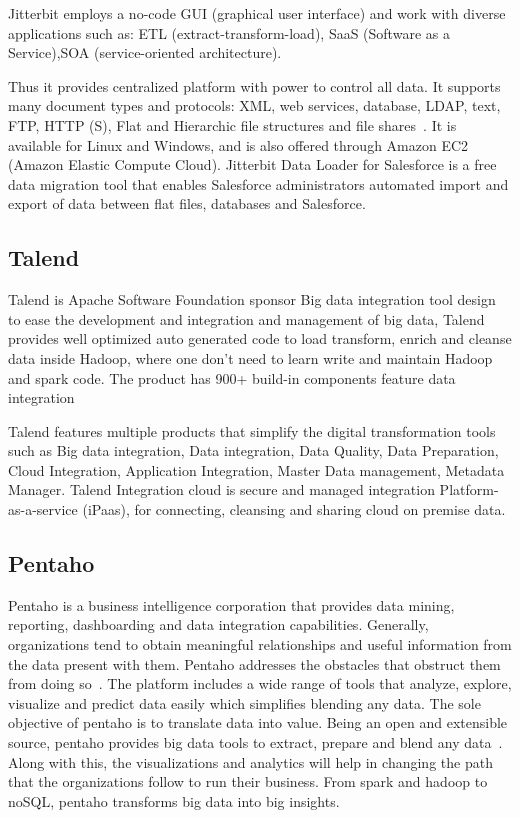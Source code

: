     Jitterbit employs a no-code GUI (graphical user interface) and
    work with diverse applications such as: ETL
    (extract-transform-load), SaaS (Software as a Service),SOA
    (service-oriented architecture).

    Thus it provides centralized platform with power to control all
    data. It supports many document types and protocols: XML, web
    services, database, LDAP, text, FTP, HTTP (S), Flat and Hierarchic
    file structures and file shares~\cite{tech-manual}. It is
    available for Linux and Windows, and is also offered through
    Amazon EC2 (Amazon Elastic Compute Cloud). Jitterbit Data Loader
    for Salesforce is a free data migration tool that enables
    Salesforce administrators automated import and export of data
    between flat files, databases and Salesforce.

    \pv

\subsection{Talend}

    Talend is Apache Software Foundation sponsor Big data integration
    tool design to ease the development and integration and management
    of big data, Talend provides well optimized auto generated code to
    load transform, enrich and cleanse data inside Hadoop, where one
    don’t need to learn write and maintain Hadoop and spark code.  The
    product has 900+ build-in components feature data integration
     
    Talend features multiple products that simplify the digital
    transformation tools such as Big data integration, Data
    integration, Data Quality, Data Preparation, Cloud Integration,
    Application Integration, Master Data management, Metadata Manager.
    Talend Integration cloud is secure and managed integration
    Platform-as-a-service (iPaas), for connecting, cleansing and
    sharing cloud on premise data.

    \pv

\subsection{Pentaho}

Pentaho is a business intelligence corporation that provides data
mining, reporting, dashboarding and data integration
capabilities. Generally, organizations tend to obtain meaningful
relationships and useful information from the data present with
them. Pentaho addresses the obstacles that obstruct them from doing
so~\cite{pent1}. The platform includes a wide range of tools that
analyze, explore, visualize and predict data easily which simplifies
blending any data. The sole objective of pentaho is to translate data
into value. Being an open and extensible source, pentaho provides big
data tools to extract, prepare and blend any data~\cite{pent2}. Along
with this, the visualizations and analytics will help in changing the
path that the organizations follow to run their business. From spark
and hadoop to noSQL, pentaho transforms big data into big insights.

